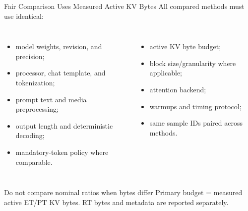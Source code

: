 \documentclass[aspectratio=169,10pt]{beamer}
\newcommand{\tightitems}{\setlength{\itemsep}{0.28em}\setlength{\parskip}{0pt}}
\begin{document}
\begin{frame}{Fair Comparison Uses Measured Active KV Bytes}
\small
All compared methods must use identical:
\begin{columns}[T,onlytextwidth]
\begin{itemize}\tightitems
  \item model weights, revision, and precision;
  \item processor, chat template, and tokenization;
  \item prompt text and media preprocessing;
  \item output length and deterministic decoding;
  \item mandatory-token policy where comparable.
\end{itemize}
\begin{itemize}\tightitems
  \item active KV byte budget;
  \item block size/granularity where applicable;
  \item attention backend;
  \item warmups and timing protocol;
  \item same sample IDs paired across methods.
\end{itemize}
\end{columns}
\begin{alertblock}{Do not compare nominal ratios when bytes differ}
Primary budget = measured active ET/PT KV bytes. RT bytes and metadata are reported separately.
\end{alertblock}
\end{frame}
\end{document}

